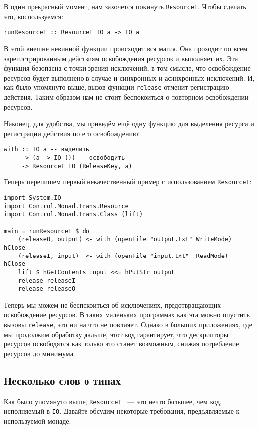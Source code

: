 В один прекрасный момент, нам захочется покинуть \lstinline'ResourceT'. Чтобы сделать это,
воспользуемся:
\begin{lstlisting}
runResourceT :: ResourceT IO a -> IO a
\end{lstlisting}
В этой внешне невинной функции происходит вся магия. Она проходит по всем зарегистрированным действиям освобождения ресурсов и выполняет их.
Эта функция безопасна с точки зрения исключений, в
том смысле, что освобождение ресурсов будет выполнено в случае и синхронных и
асинхронных исключений. И, как было упомянуто выше, вызов функции \lstinline'release'
отменит
регистрацию действия. Таким образом нам не стоит беспокоиться о повторном освобождении
ресурсов.

Наконец, для удобства, мы приведём ещё одну функцию для выделения ресурса и регистрации
действия по его освобождению:
\begin{lstlisting}
with :: IO a -- выделить
     -> (a -> IO ()) -- освободить
     -> ResourceT IO (ReleaseKey, a)
\end{lstlisting}

Теперь перепишем первый некачественный пример с использованием \lstinline'ResourceT':
\begin{lstlisting}
import System.IO
import Control.Monad.Trans.Resource
import Control.Monad.Trans.Class (lift)

main = runResourceT $ do
    (releaseO, output) <- with (openFile "output.txt" WriteMode) hClose
    (releaseI, input)  <- with (openFile "input.txt"  ReadMode)  hClose
    lift $ hGetContents input <<= hPutStr output
    release releaseI
    release releaseO
\end{lstlisting}

Теперь мы можем не беспокоиться об исключениях, предотвращающих освобождение ресурсов.
В таких маленьких программах как эта можно опустить вызовы \lstinline!release!, это ни на что
не повлияет. Однако в больших приложениях, где мы продолжим обработку дальше, этот код
гарантирует, что дескрипторы ресурсов освободятся как только это станет возможным, снижая
потребление ресурсов до минимума.

\subsection{Несколько слов о типах}

Как было упомянуто выше, \lstinline'ResourceT' ~--- это нечто большее, чем код, исполняемый в \lstinline{IO}.
Давайте обсудим некоторые требования, предъявляемые к используемой монаде.

